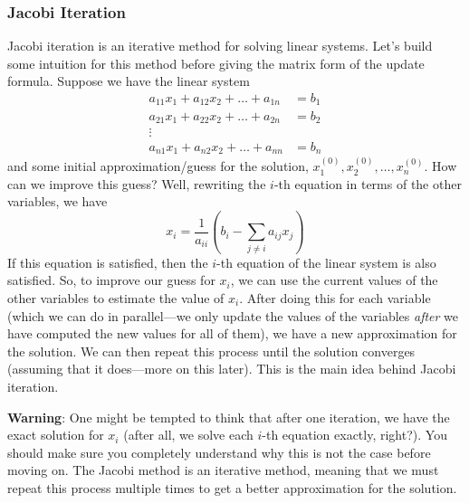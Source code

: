 \subsubsection{Jacobi Iteration}
Jacobi iteration is an iterative method for solving linear systems. Let's build some intuition for this method before giving the matrix form of the update formula. Suppose we have the linear system
\begin{align*}
    a_{11}x_1 + a_{12}x_2 + \dots + a_{1n} & = b_1 \\
    a_{21}x_1 + a_{22}x_2 + \dots + a_{2n} & = b_2 \\
    \vdots & \\
    a_{n1}x_1 + a_{n2}x_2 + \dots + a_{nn} & = b_n
\end{align*}
and some initial approximation/guess for the solution, $ x_1^{(0)}, x_2^{(0)}, \dots, x_n^{(0)} $. How can we improve this guess? Well, rewriting the $i$-th equation in terms of the other variables, we have
\begin{equation*}
    x_i = \frac{1}{a_{ii}} \left( b_i - \sum_{j \neq i} a_{ij}x_j \right)
\end{equation*}
If this equation is satisfied, then the $i$-th equation of the linear system is also satisfied. So, to improve our guess for $x_i$, we can use the current values of the other variables to estimate the value of $x_i$. After doing this for each variable (which we can do in parallel---we only update the values of the variables \textit{after} we have computed the new values for all of them), we have a new approximation for the solution. We can then repeat this process until the solution converges (assuming that it does---more on this later). This is the main idea behind Jacobi iteration.
\begin{warningBox}
    \textbf{Warning}: One might be tempted to think that after one iteration, we have the exact solution for $x_i$ (after all, we solve each $i$-th equation exactly, right?). You should make sure you completely understand why this is not the case before moving on. The Jacobi method is an iterative method, meaning that we must repeat this process multiple times to get a better approximation for the solution.
\end{warningBox}

